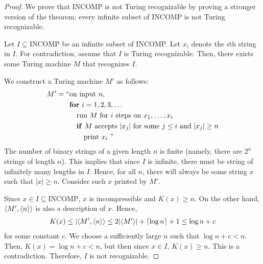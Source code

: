 \begin{proof}
    We prove that INCOMP is not Turing recognizable by proving a stronger version of the theorem: every infinite subset of INCOMP is not Turing recognizable.

    Let $I \subseteq \mathrm{INCOMP}$ be an infinite subset of INCOMP. Let $x_i$ denote the $i$th string in $I$. For contradiction, assume that $I$ is Turing recognizable. Then, there exists some Turing machine $M$ that recognizes $I$.

    We construct a Turing machine $M'$ as follows:
    $$
    \begin{aligned}
        M' = ``&\text{on input $n$,} \\
        &\text{\textbf{for} $i=1,2,3,\ldots$} \\
        &\text{\quad run $M$ for $i$ steps on $x_1,\ldots,x_i$ } \\
        &\text{\quad \textbf{if} $M$ accepts $|x_j|$ for some $j\leq i$ and $|x_j| \geq n$} \\
        &\text{\quad\quad print $x_i$ }
        "
    \end{aligned}
    $$
    The number of binary strings of a given length $n$ is finite (namely, there are $2^n$ strings of length $n$). This implies that since $I$ is infinite, there must be string of infinitely many lengths in $I$. Hence, for all $n$, there will always be some string $x$ such that $|x| \geq n$. Consider such $x$ printed by $M'$.

    Since $x \in I \subseteq \mathrm{INCOMP}$, $x$ is incompressible and $K(x) \geq n$. On the other hand, $\langle M',\langle n \rangle \rangle$ is also a description of $x$. Hence,
    $$
    \begin{aligned}
        K(x) \leq |\langle M',\langle n \rangle \rangle \leq 2|\langle M' \rangle| + \left\lceil \log n \right\rceil + 1 \leq \log n + c
    \end{aligned}
    $$
    for some constant $c$. We choose a sufficiently large $n$ such that $\log n + c < n$. Then, $K(x) = \log n + c < n$, but then since $x \in I$, $K(x) \geq n$. This is a contradiction. Therefore, $I$ is not recognizable.
\end{proof}